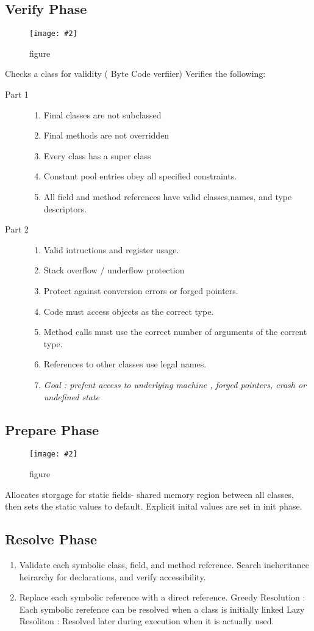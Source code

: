 \documentclass[a4paper,10pt]{scrreprt}
\newcommand{\pic}[2][figure]{\begin{figure}[h]
 \centering
 \texttt{[image: \#2]}
 \caption{#1}
\end{figure}
}
\begin{document}
\subsection{Verify Phase}
\pic{vp.png}
Checks a class for validity ( Byte Code verfiier) Verifies the following:
\begin{description}
 \item [Part 1]
 \begin{enumerate}
  \item Final classes are not subclassed
  \item Final methods are not overridden
  \item Every class has a super class
  \item Constant pool entries obey all specified constraints.
  \item All field and method references have valid classes,names, and type descriptors.
  \end{enumerate}
  \item[Part 2]
  \begin{enumerate}

  \item Valid intructions and register usage.
  \item Stack overflow / underflow protection
  \item Protect against conversion errors or forged pointers.
  \item Code must access objects as the correct type.
  \item Method calls must use the correct number of arguments of the corrent type.
  \item References to other classes use legal names.
  \item \textit{Goal : prefent access to underlying machine , forged pointers, crash or undefined state}
 \end{enumerate}

\end{description}

\subsection{Prepare Phase}
\pic{pp.png}
Allocates storgage for static fields- shared memory region between all classes, then sets the static values to default. 
Explicit inital values are set in init phase.

\subsection{Resolve Phase}
\begin{enumerate}
 \item Validate each symbolic class, field, and method reference. Search ineheritance heirarchy for declarations, and 
verify accessibility.
\item Replace each symbolic reference with a direct reference.
\subitem Greedy Resolution : Each symbolic rerefence can be resolved when a class is initially linked
\subitem Lazy Resoliton : Resolved later during execution when it is actually used.
\end{enumerate}
\end{document}
